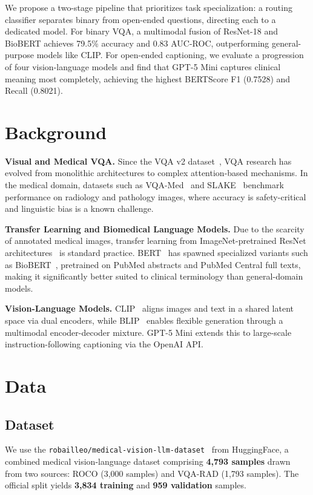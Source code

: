 \documentclass{article}
\begin{document}
We propose a two-stage pipeline that prioritizes task specialization: a routing
classifier separates binary from open-ended questions, directing each to a
dedicated model. For binary VQA, a multimodal fusion of ResNet-18 and BioBERT
achieves 79.5\% accuracy and 0.83 AUC-ROC, outperforming general-purpose models
like CLIP. For open-ended captioning, we evaluate a progression of four
vision-language models and find that GPT-5 Mini captures clinical meaning most
completely, achieving the highest BERTScore F1 (0.7528) and Recall
(0.8021).

\section{Background}
\label{sec:background}

\textbf{Visual and Medical VQA.}
Since the VQA v2 dataset~\cite{goyal2017making}, VQA research has evolved from
monolithic architectures to complex attention-based mechanisms. In the medical
domain, datasets such as VQA-Med~\cite{lau2018dataset} and
SLAKE~\cite{liu2021slake} benchmark performance on radiology and pathology
images, where accuracy is safety-critical and linguistic bias is a known
challenge.

\textbf{Transfer Learning and Biomedical Language Models.}
Due to the scarcity of annotated medical images, transfer learning from
ImageNet-pretrained ResNet architectures~\cite{he2016resnet} is standard
practice. BERT~\cite{devlin2018bert} has spawned specialized variants such as
BioBERT~\cite{lee2020biobert}, pretrained on PubMed abstracts and PubMed
Central full texts, making it significantly better suited to clinical
terminology than general-domain models.

\textbf{Vision-Language Models.}
CLIP~\cite{radford2021clip} aligns images and text in a shared latent space
via dual encoders, while BLIP~\cite{li2022blip} enables flexible generation
through a multimodal encoder-decoder mixture. GPT-5 Mini extends this to
large-scale instruction-following captioning via the OpenAI API.


\section{Data}
\label{sec:data}

\subsection{Dataset}
We use the \texttt{robailleo/medical-vision-llm-dataset}~\cite{robailleo2024}
from HuggingFace, a combined medical vision-language dataset comprising
\textbf{4,793 samples} drawn from two sources: ROCO (3,000 samples) and
VQA-RAD (1,793 samples). The official split yields \textbf{3,834 training} and
\textbf{959 validation} samples.
\end{document}
